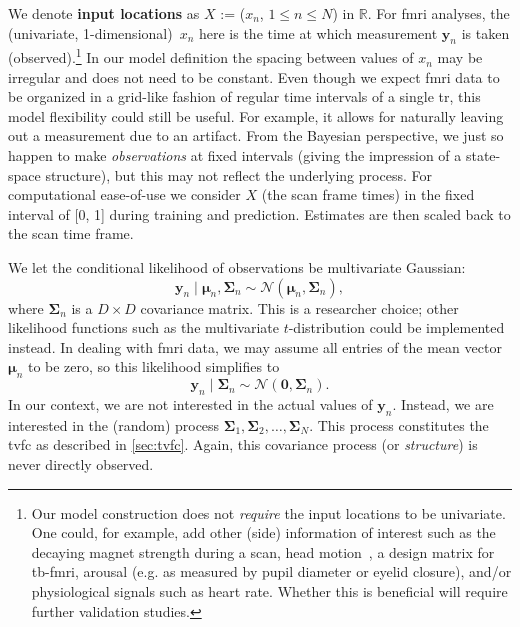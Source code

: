 We denote \textbf{input locations} as $X$ := ($x_n$, $1 \leq n \leq N$) in $\mathbb{R}$.
For \gls{fmri} analyses, the (univariate, 1-dimensional)~$x_n$ here is the time at which measurement $\mathbf{y}_n$ is taken (observed).\footnote{Our model construction does not \emph{require} the input locations to be univariate. One could, for example, add other (side) information of interest such as the decaying magnet strength during a scan, head motion~\parencite[often considered one of the most significant confounding factors, see e.g.][]{Laumann2017}, a design matrix for \gls{tb-fmri}, arousal (e.g. as measured by pupil diameter or eyelid closure), and/or physiological signals such as heart rate. Whether this is beneficial will require further validation studies.}
In our model definition the spacing between values of $x_n$ may be irregular and does not need to be constant.
Even though we expect \gls{fmri} data to be organized in a grid-like fashion of regular time intervals of a single \gls{tr}, this model flexibility could still be useful.
For example, it allows for naturally leaving out a measurement due to an artifact.
From the Bayesian perspective, we just so happen to make \emph{observations} at fixed intervals (giving the impression of a state-space structure), but this may not reflect the underlying process.
For computational ease-of-use we consider $X$ (the scan frame times) in the fixed interval of [0, 1] during training and prediction.
Estimates are then scaled back to the scan time frame.

We let the conditional likelihood of observations be multivariate Gaussian:
\begin{equation}
  \mathbf{y}_n \mid \boldsymbol{\mu}_n, \mathbf{\Sigma}_n \sim \mathcal{N}(\boldsymbol{\mu}_n, \mathbf{\Sigma}_n),
\end{equation}
where $\mathbf{\Sigma}_n$ is a $D \times D$ covariance matrix.
This is a researcher choice; other likelihood functions such as the multivariate $t$-distribution could be implemented instead.
In dealing with \gls{fmri} data, we may assume all entries of the mean vector~$\boldsymbol{\mu}_n$ to be zero, so this likelihood simplifies to
\begin{equation}
  \mathbf{y}_n \mid \mathbf{\Sigma}_n \sim \mathcal{N}(\textbf{0}, \mathbf{\Sigma}_n).
\end{equation}
In our context, we are not interested in the actual values of $\mathbf{y}_n$.
Instead, we are interested in the (random) process $\mathbf{\Sigma}_1, \mathbf{\Sigma}_2, \dots, \mathbf{\Sigma}_N$.
This process constitutes the \gls{tvfc} as described in \cref{sec:tvfc}.
Again, this covariance process (or \emph{structure}) is never directly observed.

